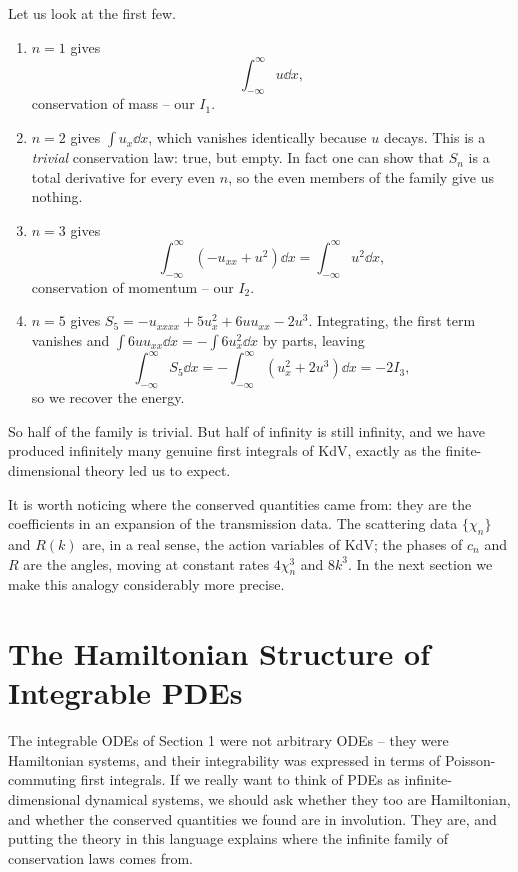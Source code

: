 \documentclass[a4paper]{scrartcl}
\begin{document}
Let us look at the first few.
\begin{enumerate}[label=(\roman*)]
	\item $n=1$ gives
	$$
	\int_{-\infty}^\infty u\dd x,
	$$
	conservation of mass -- our $I_1$.
	\item $n=2$ gives $\int u_x\dd x$, which vanishes identically because $u$ decays. This is a \emph{trivial} conservation law: true, but empty. In fact one can show that $S_n$ is a total derivative for every even $n$, so the even members of the family give us nothing.
	\item $n=3$ gives
	$$
	\int_{-\infty}^\infty\left(-u_{xx} + u^2\right)\dd x = \int_{-\infty}^\infty u^2\dd x,
	$$
	conservation of momentum -- our $I_2$.
	\item $n=5$ gives $S_5 = -u_{xxxx} + 5u_x^2 + 6uu_{xx} - 2u^3$. Integrating, the first term vanishes and $\int 6uu_{xx}\dd x = -\int6u_x^2\dd x$ by parts, leaving
	$$
	\int_{-\infty}^\infty S_5\dd x = -\int_{-\infty}^\infty\left(u_x^2 + 2u^3\right)\dd x = -2I_3,
	$$
	so we recover the energy.
\end{enumerate}
So half of the family is trivial. But half of infinity is still infinity, and we have produced infinitely many genuine first integrals of KdV, exactly as the finite-dimensional theory led us to expect.

\begin{remark}
	It is worth noticing where the conserved quantities came from: they are the coefficients in an expansion of the transmission data. The scattering data $\{\chi_n\}$ and $R(k)$ are, in a real sense, the action variables of KdV; the phases of $c_n$ and $R$ are the angles, moving at constant rates $4\chi_n^3$ and $8k^3$. In the next section we make this analogy considerably more precise.
\end{remark}

\section{The Hamiltonian Structure of Integrable PDEs}

The integrable ODEs of Section 1 were not arbitrary ODEs -- they were Hamiltonian systems, and their integrability was expressed in terms of Poisson-commuting first integrals. If we really want to think of PDEs as infinite-dimensional dynamical systems, we should ask whether they too are Hamiltonian, and whether the conserved quantities we found are in involution. They are, and putting the theory in this language explains where the infinite family of conservation laws comes from.
\end{document}
